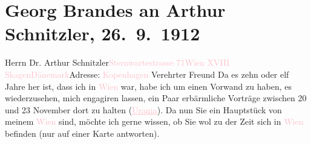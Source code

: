 

               \section[Georg Brandes an Arthur Schnitzler, 26. 9. 1912]{ Georg Brandes an Arthur Schnitzler, 26. 9. 1912}\nopagebreak{}\rehead{ }\normalsize\beginnumbering{} \toendnotes[C]{\smallbreak\pagebreak[2]} 
\toendnotes[C]{\smallbreak}\pstart{}{\pb}Herrn Dr. Arthur
                  Schnitzler\pend{}\pstart{}\textcolor{pink}{Sternwartestrasse 71}{}\ledrightnote{\textcolor{pink}{Sternwartestraße}}\pend{}\pstart{}\textcolor{pink}{Wien XVIII}{}\ledrightnote{\textcolor{pink}{XVIII., Währing}}\pend{}{\bigskip}\pstart
           \raggedleft{}{\pb}\label{K_L02091_1v}\label{K_L02091_1h}{ }\textcolor{pink}{Skagen}{}\ledrightnote{\textcolor{pink}{Skagen}}{\\}\textcolor{pink}{Dänemark}{}\ledrightnote{\textcolor{pink}{Dänemark}}{\\}Adresse: \textcolor{pink}{Kopenhagen}{}\ledrightnote{\textcolor{pink}{Kopenhagen}}\pend
           \pstart{}Verehrter Freund\pend\pstart
           Da es zehn oder elf Jahre her ist, dass ich in \textcolor{pink}{Wien}{}\ledrightnote{\textcolor{pink}{Wien}} war, habe ich um einen Vorwand zu haben, es wiederzusehen, mich
               engagiren lassen, ein Paar erbärmliche Vorträge zwischen 20{ }\strikeout{\textcolor{gray}{×}} und 23 November dort zu halten (\textcolor{pink}{\uline{Urania}}{}\ledrightnote{\textcolor{pink}{Urania}}). Da nun Sie ein Hauptstück von meinem \textcolor{pink}{Wien}{}\ledrightnote{\textcolor{pink}{Wien}}
               sind, möchte ich gerne wissen, ob Sie wol zu der Zeit sich in \textcolor{pink}{Wien}{}\ledrightnote{\textcolor{pink}{Wien}} befinden (nur auf einer Karte antworten).\pend
